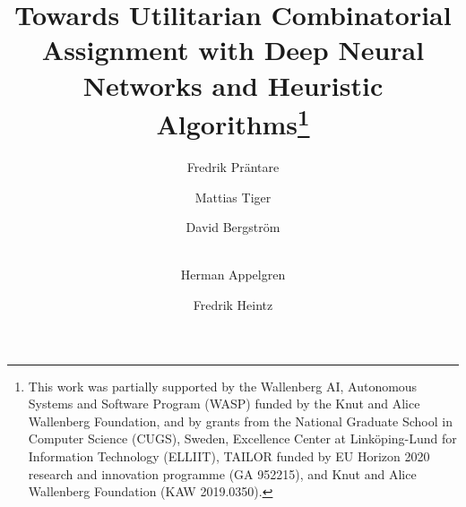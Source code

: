 \documentclass[runningheads]{llncs}
\begin{document}
	\title{Towards Utilitarian Combinatorial Assignment with Deep Neural Networks and Heuristic Algorithms\thanks{This work was partially supported by the Wallenberg AI, Autonomous Systems and Software Program (WASP) funded by the Knut and Alice Wallenberg Foundation, and by grants from the National Graduate School in Computer Science (CUGS), Sweden, Excellence Center at Linköping-Lund for Information Technology (ELLIIT), TAILOR funded by EU Horizon 2020 research and innovation programme (GA 952215), and Knut and Alice Wallenberg Foundation (KAW 2019.0350).}}
	
	\author{Fredrik Pr\"{a}ntare \and
		Mattias Tiger \and David Bergstr\"{o}m \and \\ Herman Appelgren \and Fredrik Heintz}
	
	
	
	
	\maketitle              %
	
	
	
	
\end{document}
